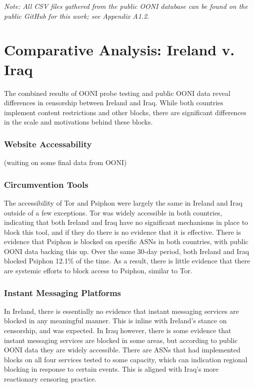 \textit{Note: All CSV files gathered from the public OONI database can be found on the public GitHub for this work; see Appendix A1.2.}


\section{Comparative Analysis: Ireland v. Iraq}

The combined results of OONI probe testing and public OONI data reveal differences in censorship between Ireland and Iraq. While both countries implement content restrictions and other blocks, there are significant differences in the scale and motivations behind these blocks.

\subsubsection{Website Accessability}

(waiting on some final data from OONI)

\subsubsection{Circumvention Tools}

The accessibility of Tor and Psiphon were largely the same in Ireland and Iraq outside of a few exceptions. Tor was widely accessible in both countries, indicating that both Ireland and Iraq have no significant mechanisms in place to block this tool, and if they do there is no evidence that it is effective. There is evidence that Psiphon is blocked on specific ASNs in both countries, with public OONI data backing this up. Over the same 30-day period, both Ireland and Iraq blocked Psiphon 12.1\% of the time. As a result, there is little evidence that there are systemic efforts to block access to Psiphon, similar to Tor.

\subsubsection{Instant Messaging Platforms}

In Ireland, there is essentially no evidence that instant messaging services are blocked in any meaningful manner. This is inline with Ireland's stance on censorship, and was expected. In Iraq however, there is some evidence that instant messaging services are blocked in some areas, but according to public OONI data they are widely accessible. There are ASNs that had implemented blocks on all four services tested to some capacity, which can indication regional blocking in response to certain events. This is aligned with Iraq's more reactionary censoring practice.

